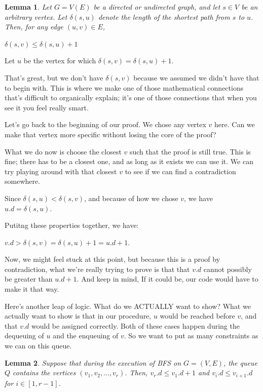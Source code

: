 \documentclass[]{article}
\newtheorem{lemma}{Lemma}
\begin{document}
\begin{lemma}
    Let $G = V(E)$ be a directed or undirected graph, and let $s \in V$ be an arbitrary vertex. Let $\delta(s, u)$ denote the length of the shortest path from $s$ to $u$. Then, for any edge $(u, v) \in E$,

    $\delta(s,v) \leq \delta(s,u) + 1$
\end{lemma}


Let $u$ be the vertex for which $\delta(s,v) = \delta(s, u) + 1$. 

That's great, but we don't have $\delta(s,v)$ because we assumed we didn't have that to begin with. This is where we make one of those mathematical connections that's difficult to organically explain; it's one of those connections that when you see it you feel really smart.

Let's go back to the beginning of our proof. We chose any vertex $v$ here. Can we make that vertex more specific without losing the core of the proof? 

What we do now is choose the closest $v$ such that the proof is still true. This is fine; there has to be a closest one, and as long as it exists we can use it. We can try playing around with that closest $v$ to see if we can find a contradiction somewhere. 

Since $\delta(s,u) < \delta(s,v)$, and because of how we chose $v$, we have $u.d = \delta(s,u)$. 

Putitng these properties together, we have:

$v.d > \delta(s,v) = \delta(s,u) + 1 = u.d + 1$.

Now, we might feel stuck at this point, but because this is a proof by contradiction, what we're really trying to prove is that that $v.d$ cannot possibly be greater than $u.d + 1$. And keep in mind, If it could be, our code would have to make it that way. 

Here's another leap of logic. What do we ACTUALLY want to show? What we actually want to show is that in our procedure, $u$ would be reached before $v$, and that $v.d$ would be assigned correctly. Both of these cases happen during the dequeuing of $u$ and the enqueuing of $v$. So we want to put as many constraints as we can on this queue. 

\begin{lemma}
    Suppose that during the execution of BFS on $G = (V,E)$, the queue $Q$ contains the vertices $(v_1, v_2, \dots, v_r)$. Then, $v_r.d \leq v_1.d + 1$ and $v_i.d \leq v_{i+1}.d$ for $i \in [1, r-1]$. 
\end{lemma}
\end{document}
